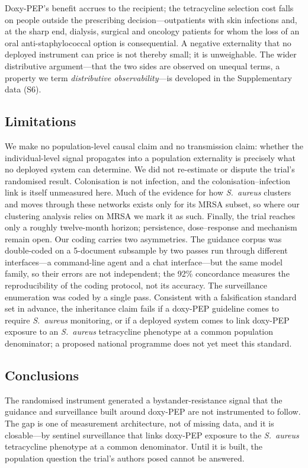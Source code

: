 \documentclass[12pt,a4paper]{article}
\newcommand{\sa}{\emph{S.~aureus}}
\begin{document}
Doxy-PEP's benefit accrues to the recipient; the tetracycline selection cost
falls on people outside the prescribing decision---outpatients with skin
infections and, at the sharp end, dialysis, surgical and oncology patients for whom
the loss of an oral anti-staphylococcal option is consequential. A negative externality that
no deployed instrument can price is not thereby small; it is unweighable. The
wider distributive argument---that the two sides are observed on unequal terms, a
property we term \emph{distributive observability}---is developed in the
Supplementary data (S6).\cite{montoya2025affected}

\subsection*{Limitations}
We make no population-level causal claim and no transmission claim: whether the
individual-level signal propagates into a population externality is precisely what
no deployed system can determine. We did not re-estimate or dispute the trial's randomised result. Colonisation is not
infection, and the colonisation--infection link is itself unmeasured here. Much of
the evidence for how \sa{} clusters and moves through these networks exists only
for its MRSA subset, so where our clustering analysis relies on MRSA we mark it as such. Finally,
the trial reaches only a roughly twelve-month horizon; persistence, dose--response
and mechanism remain open. Our coding carries two asymmetries. The guidance corpus was
double-coded on a 5-document subsample by two passes run through different
interfaces---a command-line agent and a chat interface---but the same model
family, so their errors are not independent; the 92\% concordance measures the
reproducibility of the coding protocol, not its accuracy. The surveillance
enumeration was coded by a single pass. Consistent with a
falsification standard set in advance, the inheritance claim fails if a doxy-PEP
guideline comes to require
\sa{} monitoring, or if a deployed system comes to link doxy-PEP exposure to an
\sa{} tetracycline phenotype at a common population denominator; a proposed
national programme does not yet meet this standard.\cite{ukhsa2026}

\subsection*{Conclusions}
The randomised instrument generated a bystander-resistance signal that the
guidance and surveillance built around doxy-PEP are not instrumented to follow.
The gap is one of measurement architecture, not of missing data, and it is
closable---by sentinel surveillance that links doxy-PEP exposure to the \sa{}
tetracycline phenotype at a common denominator. Until it is built, the population
question the trial's authors posed cannot be answered.
\end{document}
